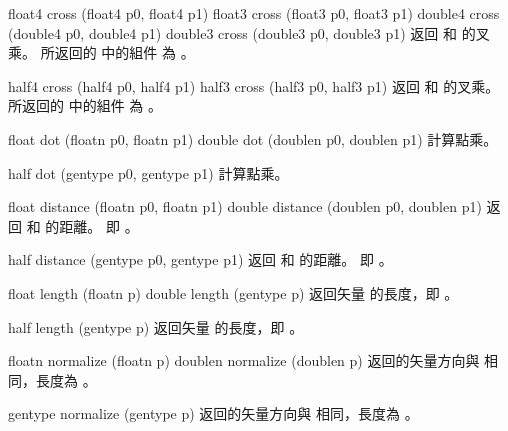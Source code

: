 float4 cross (float4 p0, float4 p1)
float3 cross (float3 p0, float3 p1)
double4 cross (double4 p0, double4 p1)
double3 cross (double3 p0, double3 p1)
\stopbuffer
{}
返回  和  的叉乘。
所返回的  中的組件  為 。
\stopbuffer

half4 cross (half4 p0, half4 p1)
half3 cross (half3 p0, half3 p1)
\stopbuffer
{}
返回  和  的叉乘。
所返回的  中的組件  為 。
\stopbuffer

float dot (floatn p0, floatn p1)
double dot (doublen p0, doublen p1)
\stopbuffer
{}
計算點乘。
\stopbuffer

half dot (gentype p0, gentype p1)
\stopbuffer
{}
計算點乘。
\stopbuffer

float distance (floatn p0,
		floatn p1)
double distance (doublen p0,
		doublen p1)
\stopbuffer
{}
返回  和  的距離。
即 。
\stopbuffer

half distance (gentype p0,
		gentype p1)
\stopbuffer
{}
返回  和  的距離。
即 。
\stopbuffer

float length (floatn p)
double length (gentype p)
\stopbuffer
{}
返回矢量  的長度，即 。
\stopbuffer

half length (gentype p)
\stopbuffer
{}
返回矢量  的長度，即 。
\stopbuffer

floatn normalize (floatn p)
doublen normalize (doublen p)
\stopbuffer
{}
返回的矢量方向與  相同，長度為 。
\stopbuffer

gentype normalize (gentype p)
\stopbuffer
{}
返回的矢量方向與  相同，長度為 。
\stopbuffer

